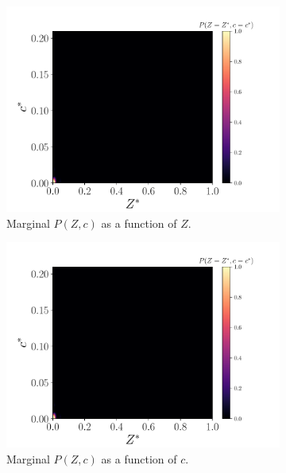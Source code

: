 \documentclass[review]{elsarticle}
\begin{document}
\begin{figure}[!tbp]%
  \centering%
  \begin{subfigure}[t]{0.48\textwidth}%
    \includegraphics[page=9,width=\textwidth]{./figs/pdfs_dice_0004.pdf}%
    \caption{Marginal $P(Z,c)$ as a function of $Z$.}%
  \end{subfigure}\hfill%
  \begin{subfigure}[t]{0.48\textwidth}%
    \includegraphics[page=10,width=\textwidth]{./figs/pdfs_dice_0004.pdf}%
    \caption{Marginal $P(Z,c)$ as a function of $c$.}%
  \end{subfigure}\\%
  \begin{subfigure}[t]{0.48\textwidth}%

\end{subfigure}
\end{figure}
\end{document}
